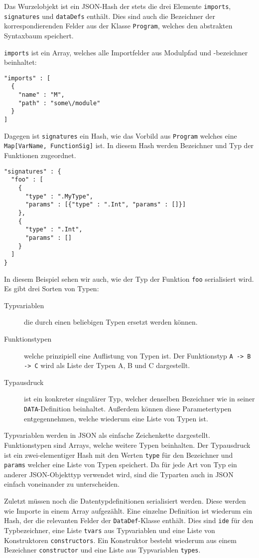 \documentclass[runningheads]{llncs}
\begin{document}
Das Wurzelobjekt ist ein JSON-Hash der stets die drei Elemente \verb|imports|, \verb|signatures| und \verb|dataDefs| enthält. Dies sind auch die Bezeichner der korrespondierenden Felder aus der Klasse \verb|Program|, welches den abstrakten Syntaxbaum speichert.

\verb|imports| ist ein Array, welches alle Importfelder aus Modulpfad und -bezeichner beinhaltet:

\begin{verbatim}
"imports" : [
  {
    "name" : "M",
    "path" : "some\/module"
  }
]
\end{verbatim}

Dagegen ist \verb|signatures| ein Hash, wie das Vorbild aus \verb|Program| welches eine \verb|Map[VarName, FunctionSig]| ist. In diesem Hash werden Bezeichner und Typ der Funktionen zugeordnet.

\begin{verbatim}
"signatures" : {
  "foo" : [
    {
      "type" : ".MyType",
      "params" : [{"type" : ".Int", "params" : []}]
    },
    {
      "type" : ".Int",
      "params" : []
    }
  ]
}
\end{verbatim}

In diesem Beispiel sehen wir auch, wie der Typ der Funktion \verb|foo| serialisiert wird. Es gibt drei Sorten von Typen:

\begin{description}
 \item[Typvariablen] die durch einen beliebigen Typen ersetzt werden können.
 \item[Funktionstypen] welche prinzipiell eine Auflistung von Typen ist. Der Funktionstyp \verb|A -> B -> C| wird als Liste der Typen A, B und C dargestellt.
 \item[Typausdruck] ist ein konkreter singulärer Typ, welcher denselben Bezeichner wie in seiner \verb|DATA|-Definition beinhaltet. Außerdem können diese Parametertypen entgegennehmen, welche wiederum eine Liste von Typen ist.
\end{description}

Typvariablen werden in JSON als einfache Zeichenkette dargestellt. Funktionstypen sind Arrays, welche weitere Typen beinhalten. Der Typausdruck ist ein zwei-elementiger Hash mit den Werten \verb|type| für den Bezeichner und \verb|params| welcher eine Liste von Typen speichert. Da für jede Art von Typ ein anderer JSON-Objekttyp verwendet wird, sind die Typarten auch in JSON einfach voneinander zu unterscheiden.

Zuletzt müssen noch die Datentypdefinitionen serialisiert werden. Diese werden wie Importe in einem Array aufgezählt. Eine einzelne Definition ist wiederum ein Hash, der die relevanten Felder der \verb|DataDef|-Klasse enthält. Dies sind \verb|ide| für den Typbezeichner, eine Liste \verb|tvars| aus Typvariablen und eine Liste von Konstruktoren \verb|constructors|. Ein Konstruktor besteht wiederum aus einem Bezeichner \verb|constructor| und eine Liste aus Typvariablen \verb|types|.
\end{document}
